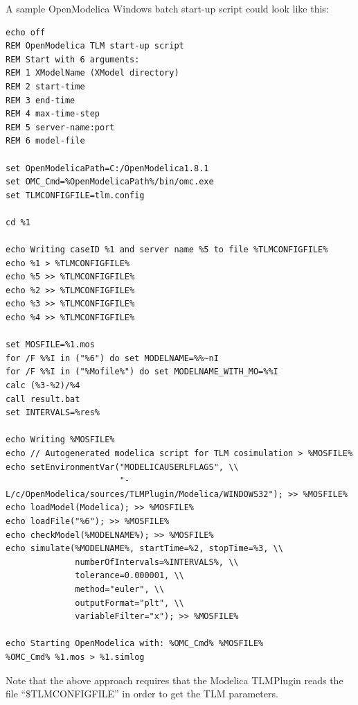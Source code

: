 \noindent A sample OpenModelica Windows batch start-up script could look like this:
{\scriptsize
\begin{verbatim}
echo off
REM OpenModelica TLM start-up script
REM Start with 6 arguments:
REM 1 XModelName (XModel directory)
REM 2 start-time
REM 3 end-time
REM 4 max-time-step
REM 5 server-name:port
REM 6 model-file

set OpenModelicaPath=C:/OpenModelica1.8.1
set OMC_Cmd=%OpenModelicaPath%/bin/omc.exe
set TLMCONFIGFILE=tlm.config

cd %1

echo Writing caseID %1 and server name %5 to file %TLMCONFIGFILE%
echo %1 > %TLMCONFIGFILE%
echo %5 >> %TLMCONFIGFILE%
echo %2 >> %TLMCONFIGFILE%
echo %3 >> %TLMCONFIGFILE%
echo %4 >> %TLMCONFIGFILE%

set MOSFILE=%1.mos
for /F %%I in ("%6") do set MODELNAME=%%~nI
for /F %%I in ("%Mofile%") do set MODELNAME_WITH_MO=%%I
calc (%3-%2)/%4
call result.bat
set INTERVALS=%res%

echo Writing %MOSFILE%
echo // Autogenerated modelica script for TLM cosimulation > %MOSFILE%
echo setEnvironmentVar("MODELICAUSERLFLAGS", \\
                       "-L/c/OpenModelica/sources/TLMPlugin/Modelica/WINDOWS32"); >> %MOSFILE%
echo loadModel(Modelica); >> %MOSFILE%
echo loadFile("%6"); >> %MOSFILE%
echo checkModel(%MODELNAME%); >> %MOSFILE%
echo simulate(%MODELNAME%, startTime=%2, stopTime=%3, \\
              numberOfIntervals=%INTERVALS%, \\
              tolerance=0.000001, \\
              method="euler", \\
              outputFormat="plt", \\
              variableFilter="x"); >> %MOSFILE%

echo Starting OpenModelica with: %OMC_Cmd% %MOSFILE%
%OMC_Cmd% %1.mos > %1.simlog
\end{verbatim}
}

\noindent Note that the above approach requires that the Modelica TLMPlugin reads the file ``\$TLMCONFIGFILE'' in order to get the TLM parameters.

